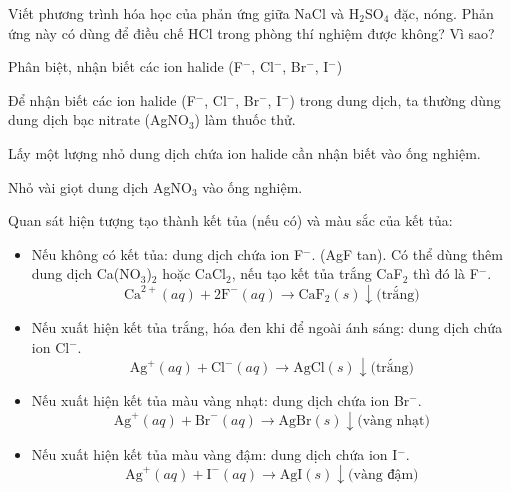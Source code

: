 \documentclass[Main.tex]{subfiles}
\begin{document}
    \begin{bt}
    Viết phương trình hóa học của phản ứng giữa NaCl và H$_2$SO$_4$ đặc, nóng. Phản ứng này có dùng để điều chế HCl trong phòng thí nghiệm được không? Vì sao?
    \end{bt}
\begin{dang}{Phân biệt, nhận biết các ion halide (F$^-$, Cl$^-$, Br$^-$, I$^-$)}\end{dang}
    \begin{phuongphap}
    Để nhận biết các ion halide (F$^-$, Cl$^-$, Br$^-$, I$^-$) trong dung dịch, ta thường dùng dung dịch bạc nitrate (AgNO$_3$) làm thuốc thử.
    \begin{cacbuoc}
        \item Lấy một lượng nhỏ dung dịch chứa ion halide cần nhận biết vào ống nghiệm.
        \item Nhỏ vài giọt dung dịch AgNO$_3$ vào ống nghiệm.
        \item Quan sát hiện tượng tạo thành kết tủa (nếu có) và màu sắc của kết tủa:
            \begin{itemize}
                \item Nếu không có kết tủa: dung dịch chứa ion F$^-$. (AgF tan). Có thể dùng thêm dung dịch Ca(NO$_3$)$_2$ hoặc CaCl$_2$, nếu tạo kết tủa trắng CaF$_2$ thì đó là F$^-$.
                \[ \text{Ca}^{2+}(aq) + 2\text{F}^-(aq) \rightarrow \text{CaF}_2(s) \downarrow \text{(trắng)} \]
                \item Nếu xuất hiện kết tủa trắng, hóa đen khi để ngoài ánh sáng: dung dịch chứa ion Cl$^-$.
                \[ \text{Ag}^+ (aq) + \text{Cl}^- (aq) \rightarrow \text{AgCl}(s) \downarrow \text{(trắng)} \]
                \item Nếu xuất hiện kết tủa màu vàng nhạt: dung dịch chứa ion Br$^-$.
                \[ \text{Ag}^+ (aq) + \text{Br}^- (aq) \rightarrow \text{AgBr}(s) \downarrow \text{(vàng nhạt)} \]
                \item Nếu xuất hiện kết tủa màu vàng đậm: dung dịch chứa ion I$^-$.
                \[ \text{Ag}^+ (aq) + \text{I}^- (aq) \rightarrow \text{AgI}(s) \downarrow \text{(vàng đậm)} \]
            \end{itemize}

\end{cacbuoc}
\end{phuongphap}
\end{document}
